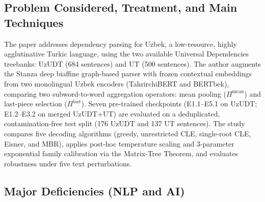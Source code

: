 \documentclass[11pt,a4paper]{article}
\begin{document}
\subsection{Problem Considered, Treatment, and Main Techniques}
The paper addresses dependency parsing for Uzbek, a low-resource, highly agglutinative Turkic language, using the two available Universal Dependencies treebanks: UzUDT (684 sentences) and UT (500 sentences). The author augments the Stanza deep biaffine graph-based parser with frozen contextual embeddings from two monolingual Uzbek encoders (TahrirchiBERT and BERTbek), comparing two subword-to-word aggregation operators: mean pooling ($\Pi^{\mathrm{mean}}$) and last-piece selection ($\Pi^{\mathrm{last}}$). Seven pre-trained checkpoints (E1.1--E5.1 on UzUDT; E1.2--E3.2 on merged UzUDT+UT) are evaluated on a deduplicated, contamination-free test split (176 UzUDT and 137 UT sentences). The study compares five decoding algorithms (greedy, unrestricted CLE, single-root CLE, Eisner, and MBR), applies post-hoc temperature scaling and 3-parameter exponential family calibration via the Matrix-Tree Theorem, and evaluates robustness under five text perturbations.

\subsection{Major Deficiencies (NLP and AI)}
\end{document}

